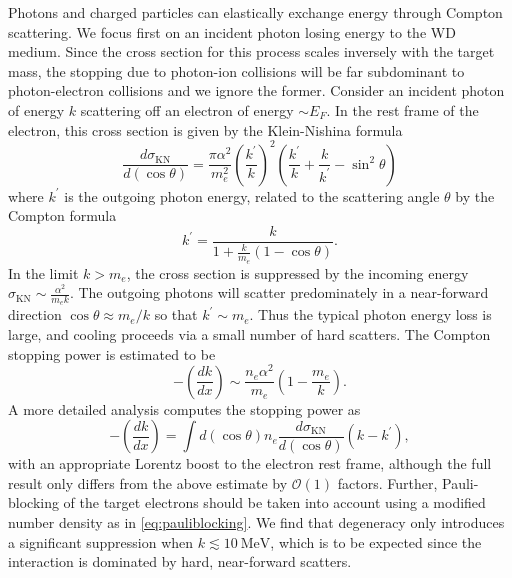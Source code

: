 \documentclass[twocolumn,showpacs,preprintnumbers,amsmath,amssymb,prd]{revtex4}
\newcommand{\OO}{\mathcal{O}}
\def\r{\right)}
\def\l{\left(}
\begin{document}
\begin{appendices}
Photons and charged particles can elastically exchange energy through Compton scattering.
We focus first on an incident photon losing energy to the WD medium.
Since the cross section for this process scales inversely with the target mass, the stopping due to photon-ion collisions will be far subdominant to photon-electron collisions and we ignore the former. 
Consider an incident photon of energy $k$ scattering off an electron of energy $\sim E_F$.
In the rest frame of the electron, this cross section is given by the Klein-Nishina formula
\begin{equation}
\label{KN}
  \frac{d\sigma_\text{KN}}{d (\cos \theta)} = \frac{\pi \alpha^2}{m_e^2} 
  \l \frac{k^\prime}{k} \r^2 
  \l \frac{k^\prime}{k} + \frac{k}{k^\prime} -\sin^2 \theta \r
\end{equation}
where $k^\prime$ is the outgoing photon energy, related to the scattering angle $\theta$ by the Compton formula
\begin{equation}
{k^{\prime }={\frac {k}{1+{\frac {k}{m_e}}(1-\cos \theta )}}}.
\end{equation}
In the limit $k > m_e$, the cross section is suppressed by the incoming energy $\sigma_\text{KN} \sim \frac{\alpha^2}{m_e k}$. 
The outgoing photons will scatter predominately in a near-forward direction $\cos \theta \approx m_e/k$ so that $k^\prime \sim m_e$.
Thus the typical photon energy loss is large, and cooling proceeds via a small number of hard scatters.
The Compton stopping power is estimated to be
\begin{equation}
\label{eq:approx-comptonSP}
  - \l\frac{dk}{dx}\r \sim \frac{n_e \alpha^2}{m_e} \l 1 - \frac{m_e}{k} \r.
\end{equation}
A more detailed analysis computes the stopping power as 
\begin{equation}
\label{eq:comptonSP}
  -\l\frac{dk}{dx}\r =  \int d (\cos \theta) n_e \frac{d\sigma_\text{KN}}{d (\cos \theta)} \l k - k^\prime \r,
\end{equation}
with an appropriate Lorentz boost to the electron rest frame, although the full result only differs from the above estimate by $\OO(1)$ factors.
Further, Pauli-blocking of the target electrons should be taken into account using a modified number density as in \eqref{eq:pauliblocking}.
We find that degeneracy only introduces a significant suppression when $k \lesssim 10 ~\text{MeV}$, which is to be expected since the interaction is dominated by hard, near-forward scatters.


\end{appendices}
\end{document}
